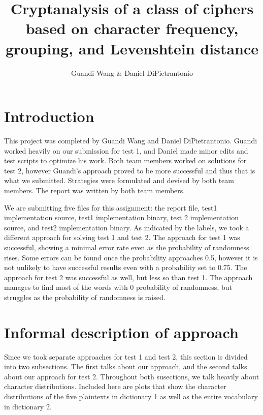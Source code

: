 \documentclass[12pt]{article}
\begin{document}
\title{Cryptanalysis of a class of ciphers based on character frequency, grouping, and Levenshtein distance}
\author{Guandi Wang \& Daniel DiPietrantonio}
\maketitle

\pagebreak

\section{Introduction}
This project was completed by Guandi Wang and Daniel DiPietrantonio. Guandi worked heavily on our submission for test 1, and Daniel made minor edits and test scripts to optimize his work. Both team members worked on solutions for test 2, however Guandi's approach proved to be more successful and thus that is what we submitted. Strategies were formulated and devised by both team members. The report was written by both team members.

We are submitting five files for this assignment: the report file, test1 implementation source, test1 implementation binary, test 2 implementation source, and test2 implementation binary. As indicated by the labels, we took a different approach for solving test 1 and test 2. The approach for test 1 was successful, showing a minimal error rate even as the probability of randomness rises. Some errors can be found once the probability approaches 0.5, however it is not unlikely to have successful results even with a probability set to 0.75. The approach for test 2 was successful as well, but less so than test 1. The approach manages to find most of the words with 0 probability of randomness, but struggles as the probability of randomness is raised.

\section{Informal description of approach}
Since we took separate approaches for test 1 and test 2, this section is divided into two subsections. The first talks about our approach, and the second talks about our approach for test 2. Throughout both susections, we talk heavily about character distributions. Included here are plots that show the character distributions of the five plaintexts in dictionary 1 as well as the entire vocabulary in dictionary 2.
\end{document}
